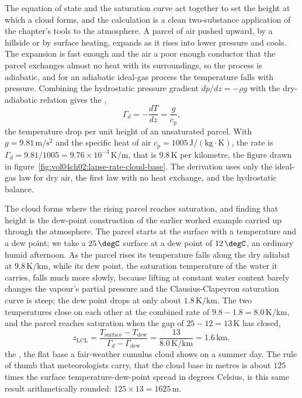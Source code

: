 The equation of state and the saturation curve act together to set the
height at which a cloud forms, and the calculation is a clean
two-substance application of the chapter's tools to the atmosphere. A parcel
of air pushed upward, by a hillside or by surface heating, expands as it
rises into lower pressure and cools. The expansion is fast enough and the
air a poor enough conductor that the parcel exchanges almost no heat with
its surroundings, so the process is adiabatic, and for an adiabatic
ideal-gas process the temperature falls with pressure. Combining the
hydrostatic pressure gradient $dp/dz = -\rho g$ with the dry-adiabatic
relation gives the ,
\[
\Gamma_d = -\frac{dT}{dz} = \frac{g}{c_p},
\]
the temperature drop per unit height of an unsaturated parcel. With $g =
9.81\,\text{m}/\text{s}^2$ and the specific heat of air $c_p =
1005\,\text{J}/(\text{kg}\cdot\si{\kelvin})$, the rate is $\Gamma_d =
9.81/1005 = 9.76\times 10^{-3}\,\si{\kelvin}/\text{m}$, that is $9.8\,
\si{\kelvin}$ per kilometre, the figure drawn in
figure~\ref{fig:vol04ch02:lapse-rate-cloud-base}. The derivation uses only
the ideal-gas law for dry air, the first law with no heat exchange, and the
hydrostatic balance.

The cloud forms where the rising parcel reaches saturation, and finding that
height is the dew-point construction of the earlier worked example carried up
through the atmosphere. The parcel starts at the surface with a temperature
and a dew point; we take a $25\,\degC$ surface at a dew point of $12\,\degC$,
an ordinary humid afternoon. As the parcel rises its temperature falls along
the dry adiabat at $9.8\,\si{\kelvin}/\text{km}$, while its dew point, the
saturation temperature of the water it carries, falls much more slowly,
because lifting at constant water content barely changes the vapour's
partial pressure and the Clausius-Clapeyron saturation curve is steep; the
dew point drops at only about $1.8\,\si{\kelvin}/\text{km}$. The two
temperatures close on each other at the combined rate of $9.8 - 1.8 =
8.0\,\si{\kelvin}/\text{km}$, and the parcel reaches saturation when the gap
of $25 - 12 = 13\,\si{\kelvin}$ has closed,
\[
z_{\text{LCL}} = \frac{T_{\text{surface}} - T_{\text{dew}}}{\Gamma_d -
\Gamma_{\text{dew}}} = \frac{13}{8.0\,\si{\kelvin}/\text{km}} =
1.6\,\text{km},
\]
the , the flat base a fair-weather cumulus
cloud shows on a summer day. The rule of thumb that meteorologists carry,
that the cloud base in metres is about $125$ times the surface
temperature-dew-point spread in degrees Celsius, is this same result
arithmetically rounded: $125\times 13 = 1625\,\text{m}$.

